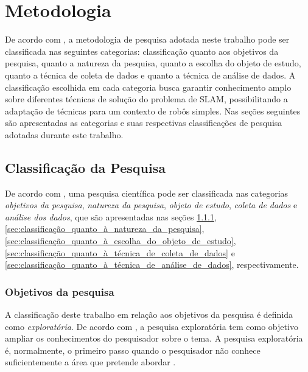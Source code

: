 \chapter[Metodologia]{Metodologia}

	De acordo com \cite{metodologiaCientifica}, a metodologia de pesquisa adotada neste trabalho pode ser classificada nas seguintes categorias: classificação quanto aos objetivos da pesquisa, quanto a natureza da pesquisa, quanto a escolha do objeto de estudo, quanto a técnica de coleta de dados e quanto a técnica de análise de dados. A classificação escolhida em cada categoria busca garantir conhecimento amplo sobre diferentes técnicas de solução do problema de SLAM, possibilitando a adaptação de técnicas para um contexto de robôs simples. Nas seções seguintes são apresentadas as categorias e suas respectivas classificações de pesquisa adotadas durante este trabalho. 

	\section{Classificação da Pesquisa} %
	\label{sec:classificação_da_pesquisa}
		
		De acordo com \cite{metodologiaCientifica}, uma pesquisa científica pode ser classificada nas categorias \textit{objetivos da pesquisa}, \textit{natureza da pesquisa}, \textit{objeto de estudo}, \textit{coleta de dados} e \textit{análise dos dados}, que são apresentadas nas seções \ref{sec:classificação_quanto_aos_objetivos_da_pesquisa}, \ref{sec:classificação_quanto_à_natureza_da_pesquisa}, \ref{sec:classificação_quanto_à_escolha_do_objeto_de_estudo}, \ref{sec:classificação_quanto_à_técnica_de_coleta_de_dados} e \ref{sec:classificação_quanto_à_técnica_de_análise_de_dados}, respectivamente.

	\subsection{Objetivos da pesquisa} %
	\label{sec:classificação_quanto_aos_objetivos_da_pesquisa}
		
		A classificação deste trabalho em relação aos objetivos da pesquisa é definida como \textit{exploratória}. De acordo com \cite{metodologiaCientifica}, a pesquisa exploratória tem como objetivo ampliar os conhecimentos do pesquisador sobre o tema. A pesquisa exploratória é, normalmente, o primeiro passo quando o pesquisador não conhece suficientemente a área que pretende abordar \cite{metodologiaDaPesquisa}.

